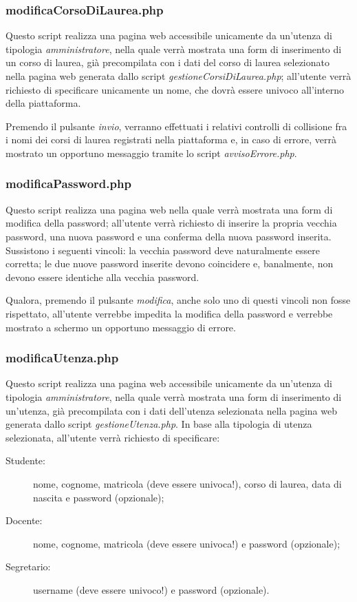 \documentclass [a4paper,11pt]{book}
\begin{document}
\medskip

\subsubsection{modificaCorsoDiLaurea.php}

Questo script realizza una pagina web accessibile unicamente da un'utenza di tipologia \emph{amministratore}, nella quale verrà mostrata una form di inserimento di un corso di laurea, già precompilata con i dati del corso di laurea selezionato nella pagina web generata dallo script \emph{gestioneCorsiDiLaurea.php}; all'utente verrà richiesto di specificare unicamente un nome, che dovrà essere univoco all'interno della piattaforma.

Premendo il pulsante \emph{invio}, verranno effettuati i relativi controlli di collisione fra i nomi dei corsi di laurea registrati nella piattaforma e, in caso di errore, verrà mostrato un opportuno messaggio tramite lo script \emph{avvisoErrore.php}.

\medskip

\subsubsection{modificaPassword.php}

Questo script realizza una pagina web nella quale verrà mostrata una form di modifica della password; all'utente verrà richiesto di inserire la propria vecchia password, una nuova password e una conferma della nuova password inserita. Sussistono i seguenti vincoli: la vecchia password deve naturalmente essere corretta; le due nuove password inserite devono coincidere e, banalmente, non devono essere identiche alla vecchia password. 

Qualora, premendo il pulsante \emph{modifica}, anche solo uno di questi vincoli non fosse rispettato, all'utente verrebbe impedita la modifica della password e verrebbe mostrato a schermo un opportuno messaggio di errore.

\medskip

\subsubsection{modificaUtenza.php}

Questo script realizza una pagina web accessibile unicamente da un'utenza di tipologia \emph{amministratore}, nella quale verrà mostrata una form di inserimento di un'utenza, già precompilata con i dati dell'utenza selezionata nella pagina web generata dallo script \emph{gestioneUtenza.php}. In base alla tipologia di utenza selezionata, all'utente verrà richiesto di specificare:
\begin{description}
\item[Studente:] nome, cognome, matricola (deve essere univoca!), corso di laurea, data di nascita e password (opzionale);
\item[Docente:] nome, cognome, matricola (deve essere univoca!) e password (opzionale);
\item[Segretario:] username (deve essere univoco!) e password (opzionale).
\end{description}
\end{document}
